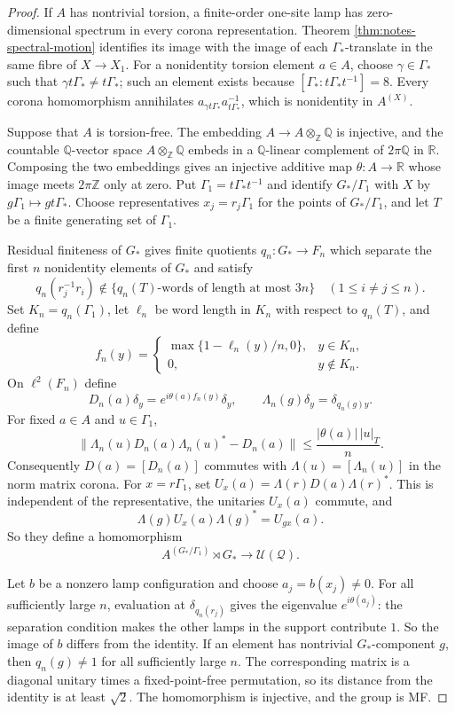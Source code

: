 \documentclass[11pt]{amsart}
\theoremstyle{definition}
\theoremstyle{remark}
\theoremstyle{plain}
\begin{document}
\begin{proof}
If $A$ has nontrivial torsion, a finite-order one-site lamp has
zero-dimensional spectrum in every corona representation.  Theorem
\ref{thm:notes-spectral-motion} identifies its image with the image of each
$\Gamma_*$-translate in the same fibre of $X\to X_1$.  For a nonidentity
torsion element $a\in A$, choose $\gamma\in\Gamma_*$ such that
$\gamma t\Gamma_*\ne t\Gamma_*$; such an element exists because
$[\Gamma_*:t\Gamma_*t^{-1}]=8$.  Every corona homomorphism annihilates
$a_{\gamma t\Gamma_*}a_{t\Gamma_*}^{-1}$, which is nonidentity in
$A^{(X)}$.

Suppose that $A$ is torsion-free.  The embedding
$A\to A\otimes_{\mathbb Z}\mathbb Q$ is injective, and the countable
$\mathbb Q$-vector space $A\otimes_{\mathbb Z}\mathbb Q$ embeds in a
$\mathbb Q$-linear complement of $2\pi\mathbb Q$ in $\mathbb R$.  Composing
the two embeddings gives an injective additive map
$\theta\colon A\to\mathbb R$ whose image meets $2\pi\mathbb Z$ only at zero.
Put
$\Gamma_1=t\Gamma_*t^{-1}$ and identify $G_*/\Gamma_1$ with $X$ by
$g\Gamma_1\mapsto gt\Gamma_*$.  Choose representatives
$x_j=r_j\Gamma_1$ for the points of $G_*/\Gamma_1$, and let $T$ be a finite
generating set of $\Gamma_1$.

Residual finiteness of $G_*$ gives finite quotients
$q_n\colon G_*\to F_n$ which separate the first $n$ nonidentity elements of
$G_*$ and satisfy
\[
 q_n(r_j^{-1}r_i)\notin
 \{\text{$q_n(T)$-words of length at most $3n$}\}
 \quad(1\leq i\ne j\leq n).
\]
Set $K_n=q_n(\Gamma_1)$, let $\ell_n$ be word length in $K_n$ with respect
to $q_n(T)$, and define
\[
 f_n(y)=
 \begin{cases}
  \max\{1-\ell_n(y)/n,0\},&y\in K_n,\\
  0,&y\notin K_n.
 \end{cases}
\]
On $\ell^2(F_n)$ define
\[
 D_n(a)\delta_y=e^{i\theta(a)f_n(y)}\delta_y,
 \qquad
 \Lambda_n(g)\delta_y=\delta_{q_n(g)y}.
\]
For fixed $a\in A$ and $u\in\Gamma_1$,
\[
 \|\Lambda_n(u)D_n(a)\Lambda_n(u)^*-D_n(a)\|
 \leq \frac{|\theta(a)|\,|u|_T}{n}.
\]
Consequently $D(a)=[D_n(a)]$ commutes with
$\Lambda(u)=[\Lambda_n(u)]$ in the norm matrix corona.  For
$x=r\Gamma_1$, set $U_x(a)=\Lambda(r)D(a)\Lambda(r)^*$.  This is independent
of the representative, the unitaries $U_x(a)$ commute, and
\[
 \Lambda(g)U_x(a)\Lambda(g)^*=U_{gx}(a).
\]
So they define a homomorphism
\[
 A^{(G_*/\Gamma_1)}\rtimes G_*\longrightarrow\mathcal U(\mathcal Q).
\]

Let $b$ be a nonzero lamp configuration and choose
$a_j=b(x_j)\ne0$.  For all sufficiently large $n$, evaluation at
$\delta_{q_n(r_j)}$ gives the eigenvalue $e^{i\theta(a_j)}$: the separation
condition makes the other lamps in the support contribute $1$.  So the
image of $b$ differs from the identity.  If an element has nontrivial
$G_*$-component $g$, then $q_n(g)\ne1$ for all sufficiently large $n$.
The corresponding matrix is a diagonal unitary times a fixed-point-free
permutation, so its distance from the identity is at least $\sqrt2$.
The homomorphism is injective, and the group is MF.
\end{proof}
\end{document}
